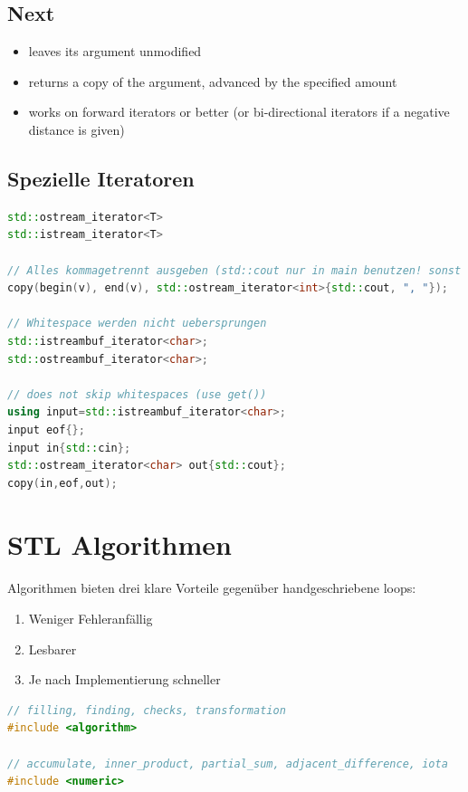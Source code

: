\subsection{Next}
\begin{itemize}
	\item leaves its argument unmodified
	\item returns a copy of the argument, advanced by the specified amount
	\item works on forward iterators or better (or bi-directional iterators if a negative distance is given)
\end{itemize}


\newpage
\subsection{Spezielle Iteratoren}
\begin{lstlisting}[language=C++]
std::ostream_iterator<T>
std::istream_iterator<T>

// Alles kommagetrennt ausgeben (std::cout nur in main benutzen! sonst untestbar)
copy(begin(v), end(v), std::ostream_iterator<int>{std::cout, ", "});

// Whitespace werden nicht uebersprungen
std::istreambuf_iterator<char>;
std::ostreambuf_iterator<char>;

// does not skip whitespaces (use get())
using input=std::istreambuf_iterator<char>;
input eof{};
input in{std::cin};
std::ostream_iterator<char> out{std::cout};
copy(in,eof,out);
\end{lstlisting}

\section{STL Algorithmen}
Algorithmen bieten drei klare Vorteile gegenüber handgeschriebene loops:
\begin{enumerate}
	\item Weniger Fehleranfällig
	\item Lesbarer
	\item Je nach Implementierung schneller
\end{enumerate}
\begin{lstlisting}[language=C++, caption=Algorithmen Headers]
// filling, finding, checks, transformation
#include <algorithm>

// accumulate, inner_product, partial_sum, adjacent_difference, iota
#include <numeric> 
\end{lstlisting}

